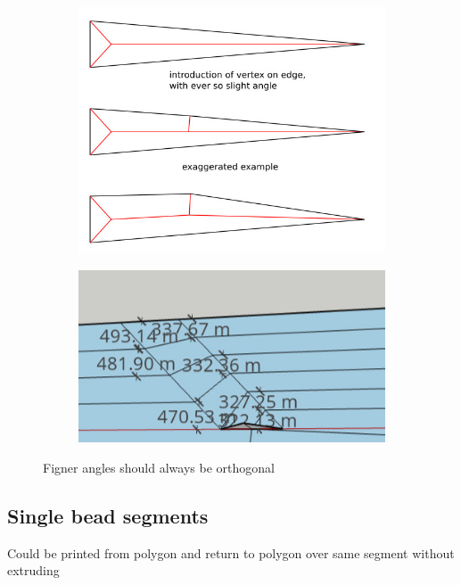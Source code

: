 \begin{figure}
\begin{subfigure}{0.45\columnwidth}
\includegraphics[width=\columnwidth]{sources/method/finger_angles.jpg}
\end{subfigure}
\begin{subfigure}{0.45\columnwidth}
\includegraphics[width=\columnwidth]{sources/method/finger_angles_2.jpg}
\end{subfigure}
\caption{Figner angles should always be orthogonal}
\label{finger_angles}
\end{figure}



\subsection{Single bead segments}
Could be printed from polygon and return to polygon over same segment without extruding

